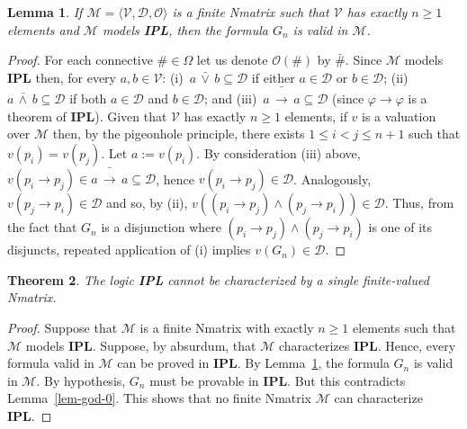 \documentclass[12pt]{article}
\newtheorem{theorem}{Theorem}[section]
\newtheorem{lemma}[theorem]{Lemma}
\begin{document}
\begin{lemma} \label{lem-god-1}
If $\mathcal{M} = \langle \mathcal{V},\mathcal{D},\mathcal{O} \rangle$ is a finite Nmatrix such that $\mathcal{V}$ has exactly $n\geq 1$ elements and $\mathcal{M}$ models \textbf{IPL}, then the formula $G_n$ is valid in  $\mathcal{M}$.
\end{lemma}
\begin{proof} For each connective $\# \in \Omega$ let us denote $\mathcal{O}(\#)$ by $\bar{\#}$.
Since $\mathcal{M}$ models \textbf{IPL} then, for every $a,b\in \mathcal{V}$: (i)~$a \,\bar{\vee}\, b \subseteq \mathcal{D}$ if either $a \in \mathcal{D}$ or $b \in \mathcal{D}$;  (ii)~$a \,\bar{\land}\, b \subseteq \mathcal{D}$ if both $a \in \mathcal{D}$ and $b \in \mathcal{D}$; and  (iii)~$a \,\bar{\to}\, a \subseteq \mathcal{D}$ (since $\varphi \to \varphi$ is a theorem of  \textbf{IPL}). Given that $\mathcal{V}$ has exactly $n\geq 1$ elements, if $v$ is a valuation over $\mathcal{M}$ then, by the pigeonhole principle,  there exists $1 \leq i < j \leq n+1$ such that $v(p_i)=v(p_j)$. Let $a:=v(p_i)$. By consideration (iii) above, $v(p_i \to p_j) \in a \,\bar{\to}\, a \subseteq \mathcal{D}$, hence $v(p_i \to p_j) \in  \mathcal{D}$. Analogously, $v(p_j \to p_i) \in  \mathcal{D}$ and so, by (ii), $v((p_i \to p_j) \land (p_j \to p_i)) \in  \mathcal{D}$. Thus, from the fact that $G_n$ is a disjunction where $(p_i \to p_j) \land (p_j \to p_i)$ is one of its disjuncts, repeated application of (i) implies $v(G_n) \in \mathcal{D}$.
\end{proof}



\begin{theorem} \label{unchar-IPL}
The logic \textbf{IPL} cannot be characterized by a single finite-valued Nmatrix.
\end{theorem}
\begin{proof}
Suppose that $\mathcal{M}$ is a finite Nmatrix with exactly $n\geq 1$ elements such that $\mathcal{M}$ models \textbf{IPL}. Suppose, by absurdum, that $\mathcal{M}$ characterizes \textbf{IPL}. Hence, every formula valid in $\mathcal{M}$ can be proved in \textbf{IPL}. By Lemma~\ref{lem-god-1}, the formula $G_n$ is valid in  $\mathcal{M}$. By hypothesis, $G_n$ must be provable in \textbf{IPL}. But this contradicts Lemma~\ref{lem-god-0}. This shows that no finite Nmatrix $\mathcal{M}$ can characterize \textbf{IPL}.
\end{proof}
\end{document}
